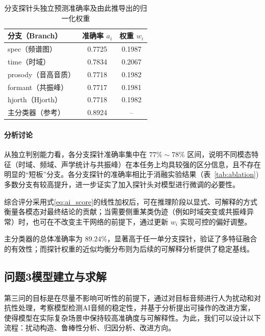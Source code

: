 \documentclass[a4paper,12pt]{article}
\begin{document}
\begin{table}[htbp]
\centering
\caption{分支探针头独立预测准确率及由此推导出的归一化权重}
\label{tab:probe-acc-weight}
\begin{tabular}{lcc}
\toprule
分支（Branch） & 准确率 $a_i$ & 权重 $w_i$ \\
\midrule
spec（频谱图）      & 0.7725 & 0.1987 \\
time（时域）        & 0.7834 & 0.2067 \\
prosody（音高音质） & 0.7718 & 0.1982 \\
formant（共振峰）   & 0.7717 & 0.1981 \\
hjorth（Hjorth）    & 0.7718 & 0.1982 \\
\midrule
主分类器（参考）    & 0.8924 & -- \\
\bottomrule
\end{tabular}
\end{table}

\paragraph{分析讨论}\par

从独立判别能力看，各分支探针准确率集中在 $77\%\sim78\%$ 区间，说明不同模态特征（时域、频域、声学统计与共振峰）在本任务上均具较强的区分信息，且不存在明显的“短板”分支。各分支探针的准确率相比于消融实验结果（表~\ref{tab:ablation})多数分支有较高提升，进一步证实了加入探针头对模型进行微调的必要性。

综合评分采用式\ref{eq:ai_score}的线性加权后，可在推理阶段以显式、可解释的方式衡量各模态对最终结论的贡献；当需要侧重某类伪迹（例如时域突变或共振峰异常）时，也可在不改变主干网络的前提下，通过更新 $w_i$ 实现可控的偏好调整。

主分类器的总体准确率为 $89.24\%$，显著高于任一单分支探针，验证了多特征融合的有效性；而探针权重的近似均衡分布则为后续的可解释分析提供了稳定基线。


\subsection{问题3模型建立与求解}

第三问的目标是在尽量不影响可听性的前提下，通过对目标音频进行人为扰动和对抗性处理，考察模型检测AI音频的稳定性，并基于分析提出可操作的改进方案，使得模型在实际复杂场景中保持较高准确度与可解释性。为此，我们可以设计以下流程：扰动构造、鲁棒性分析、归因分析、改进方向。
\end{document}
